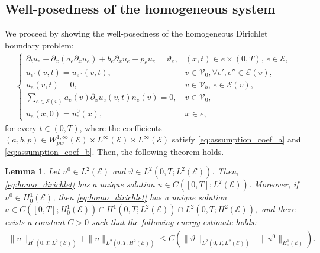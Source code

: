 \documentclass[a4paper, 10pt, english]{article}
\newtheorem{lemma}{Lemma}[section]
\begin{document}
\subsection{Well-posedness of the homogeneous system}
We proceed by showing the well-posedness of the homogeneous Dirichlet boundary problem:
\begin{align}\label{eq:homo_dirichlet}
    \begin{cases}
        \partial_t u_e - \partial_{x}( a_e \partial_x u_e) + b_e \partial_x u_e + p_e u_e = \vartheta_e, & (x,t) \in e \times (0, T),  \, e \in \mathcal{E},\\
        u_{e'}(v, t) = u_{e''}(v, t), &v \in \mathcal{V}_0, \forall e', e'' \in \mathcal{E}(v), \\
        u_e(v, t) = 0, & v\in \mathcal{V}_b, \, e \in \mathcal{E}(v), \\
        \sum_{e \in \mathcal{E}(v)} a_e(v)\partial_x u_e(v, t) n_e(v) = 0, & v \in \mathcal{V}_0, \\
        u_e(x, 0) = u_e^0(x), & x \in e,
    \end{cases}
\end{align}
for every $t\in(0,T)$, where the coefficients $(a, b, p) \in W^{1,\infty}_{pw}(\mathcal{E}) \times L^{\infty}(\mathcal{E}) \times L^{\infty}(\mathcal{E})$ satisfy \eqref{eq:assumption_coef_a} and \eqref{eq:assumption_coef_b}. Then, the following theorem holds.
\begin{lemma}\label{th:well_posed_heat_graph}
    Let $u^0 \in L^2(\mathcal{E})$ and $\vartheta \in L^2(0, T; L^2(\mathcal{E}))$. Then, \eqref{eq:homo_dirichlet} has a unique solution $u \in C([0, T]; L^2(\mathcal{E}))$. Moreover, if $u^0 \in H_0^1(\mathcal{E})$, then \eqref{eq:homo_dirichlet} has a unique solution $ u \in C([0, T]; H_0^1(\mathcal{E})) \cap H^1(0, T; L^2(\mathcal{E})) \cap L^2(0, T; H^2(\mathcal{E})),$ and there exists a constant $C > 0$ such that the following energy estimate holds:
    \begin{align}\label{eq:u_estimation}
        \|u\|_{H^1(0, T; L^2(\mathcal{E}))} + \|u\|_{L^2(0, T; H^2(\mathcal{E}))} \leq C \left( \|\vartheta\|_{L^2(0, T; L^2(\mathcal{E}))} + \|u^0\|_{H^1_0(\mathcal{E})} \right).
    \end{align}
\end{lemma}
\end{document}
